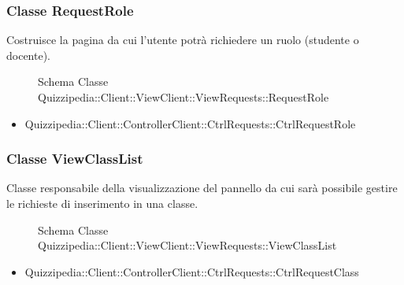 \subsubsection{Classe RequestRole}
Costruisce la pagina da cui l'utente potrà richiedere un ruolo (studente o docente).
\begin{figure}[H]
\centering
\noindent{}
\caption{Schema Classe Quizzipedia::Client::ViewClient::ViewRequests::RequestRole}
\end{figure}
\begin{itemize}
\item Quizzipedia::Client::ControllerClient::CtrlRequests::CtrlRequestRole
\end{itemize}
\subsubsection{Classe ViewClassList}
Classe responsabile della visualizzazione del pannello da cui sarà possibile gestire le richieste di inserimento in una classe.
\begin{figure}[H]
\centering
\noindent{}
\caption{Schema Classe Quizzipedia::Client::ViewClient::ViewRequests::ViewClassList}
\end{figure}
\begin{itemize}
\item Quizzipedia::Client::ControllerClient::CtrlRequests::CtrlRequestClass
\end{itemize}
